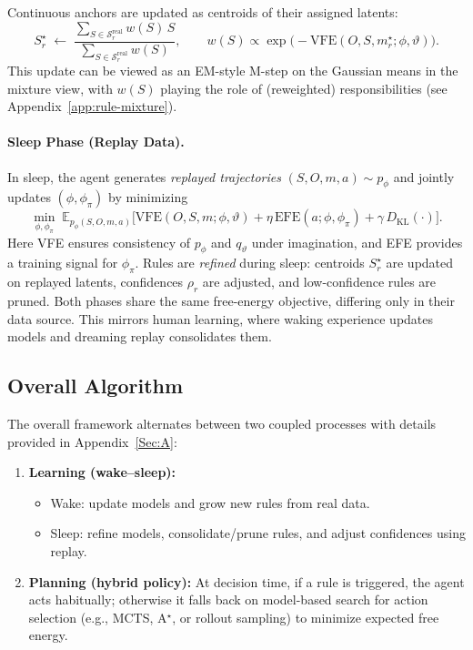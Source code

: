 \documentclass{article} %
\newcommand{\revise}[1]{#1}
\begin{document}
Continuous anchors are updated as centroids of their assigned latents:
{\small\[
S_r^\star \;\leftarrow\; 
\frac{\sum_{S \in \mathcal S_r^{\mathrm{real}}} w(S)\,S}
     {\sum_{S \in \mathcal S_r^{\mathrm{real}}} w(S)},
\qquad
w(S) \propto \exp\!\big(-\text{VFE}(O,S,m_r^\star;\phi,\vartheta)\big).
\]}
\revise{This update can be viewed as an EM-style M-step on the Gaussian means in the mixture view, with $w(S)$ playing the role of (reweighted) responsibilities (see Appendix~\ref{app:rule-mixture}).}
\paragraph{Sleep Phase (Replay Data).}
In sleep, the agent generates \emph{replayed trajectories} $(S,O,m,a)\sim p_\phi$ and jointly updates 
$(\phi,\phi_\pi)$ by minimizing
{\small \[
\min_{\phi,\phi_\pi}\; 
\mathbb{E}_{p_\phi(S,O,m,a)}\Big[ 
\text{VFE}(O,S,m;\phi,\vartheta) + \eta\,\text{EFE}(a;\phi,\phi_\pi) 
+ \gamma\, D_{\mathrm{KL}}(\cdot) \Big].
\]}
Here VFE ensures consistency of $p_\phi$ and $q_\vartheta$ under imagination, and EFE provides a training 
signal for $\phi_\pi$.  
Rules are \emph{refined} during sleep: centroids $S_r^\star$ are updated on replayed latents, confidences 
$\rho_r$ are adjusted, and low-confidence rules are pruned. Both phases share the same free-energy objective, differing only in their data source.  
This mirrors human learning, where waking experience updates models and dreaming replay consolidates them.  
\subsection{Overall Algorithm}
The overall framework alternates between two coupled processes with details provided in Appendix~\ref{Sec:A}:  
\begin{enumerate}
  \item \textbf{Learning (wake--sleep):}  
  \begin{itemize}
    \item Wake: update models and grow new rules from real data.  
    \item Sleep: refine models, consolidate/prune rules, and adjust confidences using replay.  
  \end{itemize}
  \item \textbf{Planning (hybrid policy):}  
  At decision time, if a rule is triggered, the agent acts habitually; otherwise it falls back on 
  model-based search for action selection (e.g., MCTS, A$^\star$, or rollout sampling) to minimize expected free energy.  
\end{enumerate}
\end{document}
